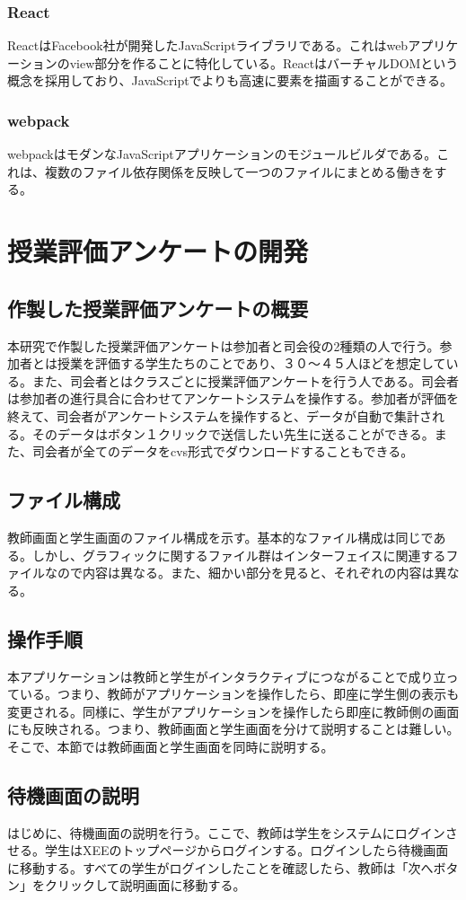 \documentclass[11pt,a4paper]{jsarticle}
\begin{document}
\subsubsection{React}
ReactはFacebook社が開発したJavaScriptライブラリである。これはwebアプリケーションのview部分を作ることに特化している。ReactはバーチャルDOMという概念を採用しており、JavaScriptでよりも高速に要素を描画することができる。
\subsubsection{webpack}
webpackはモダンなJavaScriptアプリケーションのモジュールビルダである。これは、複数のファイル依存関係を反映して一つのファイルにまとめる働きをする。
\section{授業評価アンケートの開発}
\subsection{作製した授業評価アンケートの概要}
本研究で作製した授業評価アンケートは参加者と司会役の2種類の人で行う。参加者とは授業を評価する学生たちのことであり、３０～４５人ほどを想定している。また、司会者とはクラスごとに授業評価アンケートを行う人である。司会者は参加者の進行具合に合わせてアンケートシステムを操作する。参加者が評価を終えて、司会者がアンケートシステムを操作すると、データが自動で集計される。そのデータはボタン１クリックで送信したい先生に送ることができる。また、司会者が全てのデータをcvs形式でダウンロードすることもできる。
\subsection{ファイル構成}
教師画面と学生画面のファイル構成を示す。基本的なファイル構成は同じである。しかし、グラフィックに関するファイル群はインターフェイスに関連するファイルなので内容は異なる。また、細かい部分を見ると、それぞれの内容は異なる。
\subsection{操作手順}
本アプリケーションは教師と学生がインタラクティブにつながることで成り立っている。つまり、教師がアプリケーションを操作したら、即座に学生側の表示も変更される。同様に、学生がアプリケーションを操作したら即座に教師側の画面にも反映される。つまり、教師画面と学生画面を分けて説明することは難しい。そこで、本節では教師画面と学生画面を同時に説明する。
\subsection{待機画面の説明}
はじめに、待機画面の説明を行う。ここで、教師は学生をシステムにログインさせる。学生はXEEのトップページからログインする。ログインしたら待機画面に移動する。すべての学生がログインしたことを確認したら、教師は「次へボタン」をクリックして説明画面に移動する。
\end{document}
